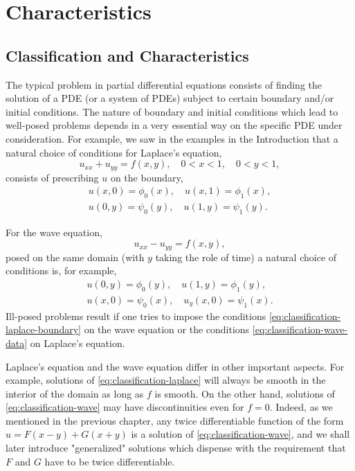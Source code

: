 \section{Characteristics}\label{chap:characteristics}

\subsection{Classification and Characteristics}\label{sec:classification-characteristics}

The typical problem in partial differential equations consists of finding the solution of a PDE (or a system of PDEs) subject to certain boundary and/or initial conditions. The nature of boundary and initial conditions which lead to well-posed problems depends in a very essential way on the specific PDE under consideration. For example, we saw in the examples in the Introduction that a natural choice of conditions for Laplace's equation,
\begin{equation}\label{eq:classification-laplace}
u_{xx}+u_{yy}=f(x,y),\quad0<x<1,\quad0<y<1,
\end{equation}
consists of prescribing $u$ on the boundary,
\begin{equation}\label{eq:classification-laplace-boundary}
\begin{gathered}
u(x,0)=\phi_0(x),\quad u(x,1)=\phi_1(x),\\
u(0,y)=\psi_0(y),\quad u(1,y)=\psi_1(y).
\end{gathered}
\end{equation}


For the wave equation,
\begin{equation}\label{eq:classification-wave}
u_{xx}-u_{yy}=f(x,y),
\end{equation}
posed on the same domain (with $y$ taking the role of time) a natural choice of conditions is, for example,
\begin{equation}\label{eq:classification-wave-data}
\begin{gathered}
u(0,y)=\phi_0(y),\quad u(1,y)=\phi_1(y),\\
u(x,0)=\psi_0(x),\quad u_y(x,0)=\psi_1(x).
\end{gathered}
\end{equation}
Ill-posed problems result if one tries to impose the conditions \eqref{eq:classification-laplace-boundary} on the wave equation or the conditions \eqref{eq:classification-wave-data} on Laplace's equation.

Laplace's equation and the wave equation differ in other important aspects. For example, solutions of \eqref{eq:classification-laplace} will always be smooth in the interior of the domain as long as $f$ is smooth. On the other hand, solutions of \eqref{eq:classification-wave} may have discontinuities even for $f=0$. Indeed, as we mentioned in the previous chapter, any twice differentiable function of the form $u=F(x-y)+G(x+y)$ is a solution of \eqref{eq:classification-wave}, and we shall later introduce "generalized" solutions which dispense with the requirement that $F$ and $G$ have to be twice differentiable.


